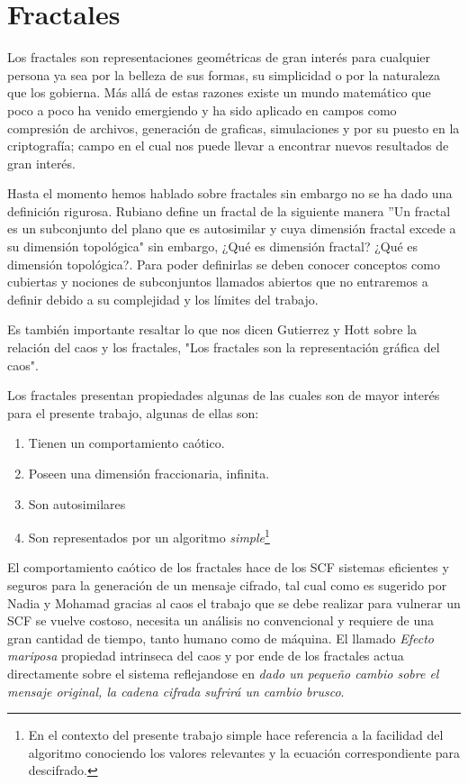 \section{Fractales}

Los fractales son representaciones geom\'etricas de gran inter\'es para cualquier persona ya sea por la belleza de sus formas, su simplicidad o por la naturaleza que los gobierna. M\'as all\'a de estas razones existe un mundo matem\'atico que poco a poco ha venido emergiendo y ha sido aplicado en campos como compresi\'on de archivos, generaci\'on de graficas, simulaciones y por su puesto en la criptograf\'ia; campo en el cual nos puede llevar a encontrar nuevos resultados de gran inter\'es. 

Hasta el momento hemos hablado sobre fractales sin embargo no se ha dado una definici\'on rigurosa. Rubiano define un fractal de la siguiente manera ''Un fractal es un subconjunto del plano que es autosimilar y cuya dimensi\'on fractal excede a su dimensi\'on topol\'ogica" \cite{Rubiano} sin embargo, ¿Qu\'e es dimensi\'on fractal? ¿Qu\'e es dimensi\'on topol\'ogica?. Para poder definirlas se deben conocer conceptos como cubiertas y nociones de subconjuntos llamados abiertos que no entraremos a definir debido a su complejidad y los l\'imites del trabajo.

Es tambi\'en importante resaltar lo que nos dicen Gutierrez y Hott \cite{Gutierrez} sobre la relaci\'on del caos y los fractales, "Los fractales son la representaci\'on gr\'afica del caos".

Los fractales presentan propiedades algunas de las cuales son de mayor inter\'es para el presente trabajo, algunas de ellas son:
 
\begin{enumerate}
  \item Tienen un comportamiento ca\'otico. 
  \item Poseen una dimensi\'on fraccionaria, infinita.
  \item Son autosimilares
  \item Son representados por un algoritmo \emph{simple}\footnote{En el contexto del presente trabajo simple hace referencia a la facilidad del algoritmo conociendo los valores relevantes y la ecuaci\'on correspondiente para descifrado.}
\end{enumerate}

El comportamiento ca\'otico de los fractales hace de los SCF sistemas eficientes y seguros para la generaci\'on de un mensaje cifrado, tal cual como es sugerido por Nadia y Mohamad \cite{Nadia,Nadia2} gracias al caos el trabajo que se debe realizar para vulnerar un SCF se vuelve costoso, necesita un an\'alisis no convencional y requiere de una gran cantidad de tiempo, tanto humano como de m\'aquina. El llamado \emph{Efecto mariposa} propiedad intrinseca del caos y por ende de los fractales actua directamente sobre el sistema reflejandose en \emph{dado un peque\~no cambio sobre el mensaje original, la cadena cifrada sufrir\'a un cambio brusco}.

